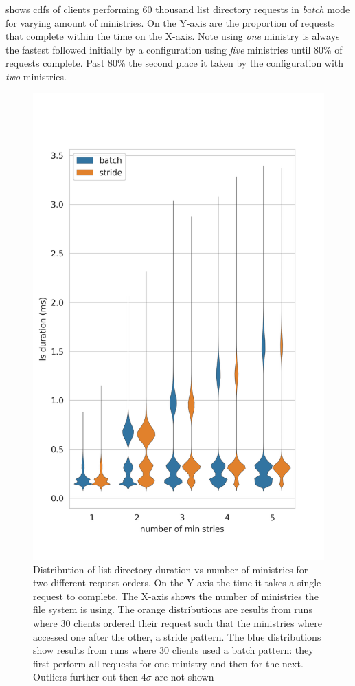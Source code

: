  shows \acp{cdf} of clients performing 60 thousand list directory requests in \textit{batch} mode for varying amount of ministries. On the Y-axis are the proportion of requests that complete within the time on the X-axis. Note using \textit{one} ministry is always the fastest followed initially by a configuration using \textit{five} ministries until 80\% of requests complete. Past 80\% the second place it taken by the configuration with \textit{two} ministries.

\begin{figure}[bp]
	\centering
	\includegraphics[height=\textheight]{../results/plots/ls_vs_numb_ministries.png}
	\caption{Distribution of list directory duration vs number of ministries for two different request orders. On the Y-axis the time it takes a single request to complete. The X-axis shows the number of ministries the file system is using. The orange distributions are results from runs where $30$ clients ordered their request such that the ministries where accessed one after the other, a stride pattern. The blue distributions show results from runs where $30$ clients used a batch pattern: they first perform all requests for one ministry and then for the next. Outliers further out then $4\sigma$ are not shown}
	\label{fig:ls_vs_ministries}
\end{figure}%

